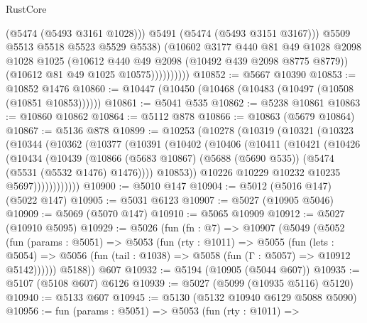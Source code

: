 \begin{lexlean}{RustCore}
\begin{coremodule}
                          (@5474 (@5493 @3161 @1028)))
                        @5491
                        (@5474 (@5493 @3151 @3167)))
                      @5509
                      @5513
                      @5518
                      @5523
                      @5529
                      @5538)
                    (@10602
                      @3177
                      @440
                      @81
                      @49
                      @1028
                      @2098
                      @1028
                      @1025
                      (@10612 @440 @49 @2098 (@10492 @439 @2098 @8775 @8779))
                      (@10612 @81 @49 @1025 @10575))))))))))
@10852 := @5667 @10390
@10853 := @10852 @1476
@10860 := @10447 (@10450 (@10468 (@10483 (@10497 (@10508 (@10851 @10853))))))
@10861 := @5041 @535
@10862 := @5238 @10861
@10863 := @10860 @10862
@10864 := @5112 @878
@10866 := @10863 (@5679 @10864)
@10867 := @5136 @878
@10899 := @10253
    (@10278
      (@10319
        (@10321
          (@10323
            (@10344
              (@10362
                (@10377
                  (@10391
                    (@10402
                      (@10406
                        (@10411
                          (@10421
                            (@10426
                              (@10434
                                (@10439
                                  (@10866
                                    (@5683 @10867)
                                    (@5688 (@5690 @535))
                                    (@5474 (@5531 (@5532 @1476) @1476))))
                                @10853))
                            @10226
                            @10229
                            @10232
                            @10235
                            @5697))))))))))))
@10900 := @5010 @147
@10904 := @5012 (@5016 @147) (@5022 @147)
@10905 := @5031 @6123
@10907 := @5027 (@10905 @5046)
@10909 := @5069 (@5070 @147)
@10910 := @5065 @10909
@10912 := @5027 (@10910 @5095)
@10929 := @5026
    (fun (fn : @7) =>
    @10907
      (@5049
        (@5052
          (fun (params : @5051) =>
          @5053
            (fun (rty : @1011) =>
            @5055
              (fun (lets : @5054) =>
              @5056 (fun (tail : @1038) => @5058 (fun (Γ : @5057) => @10912 @5142))))))
        @5188))
    @607
@10932 := @5194 (@10905 (@5044 @607))
@10935 := @5107 (@5108 @607) @6126
@10939 := @5027 (@5099 (@10935 @5116) @5120)
@10940 := @5133 @607
@10945 := @5130 (@5132 @10940 @6129 @5088 @5090)
@10956 := fun (params : @5051) =>
  @5053
    (fun (rty : @1011) =>

\end{coremodule}
\end{lexlean}
